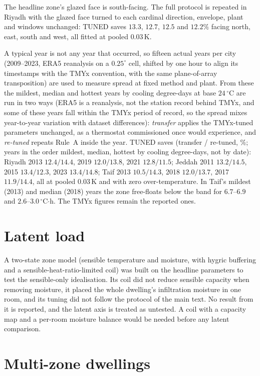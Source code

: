 \documentclass[11pt]{article}
\begin{document}
The headline zone's glazed face is south-facing. The full protocol is repeated in Riyadh with the glazed face turned to each cardinal direction, envelope, plant and windows unchanged: TUNED saves $13.3$, $12.7$, $12.5$ and $12.2\%$ facing north, east, south and west, all fitted at pooled $0.03\,$K.

A typical year is not any year that occurred, so fifteen actual years per city (2009--2023, ERA5 reanalysis on a $0.25^\circ$ cell, shifted by one hour to align its timestamps with the TMYx convention, with the same plane-of-array transposition) are used to measure spread at fixed method and plant. From these the mildest, median and hottest years by cooling degree-days at base $24\,^\circ$C are run in two ways (ERA5 is a reanalysis, not the station record behind TMYx, and some of these years fall within the TMYx period of record, so the spread mixes year-to-year variation with dataset differences): \emph{transfer} applies the TMYx-tuned parameters unchanged, as a thermostat commissioned once would experience, and \emph{re-tuned} repeats Rule~A inside the year. TUNED saves (transfer / re-tuned, \%; years in the order mildest, median, hottest by cooling degree-days, not by date): Riyadh 2013 $12.4/14.4$, 2019 $12.0/13.8$, 2021 $12.8/11.5$; Jeddah 2011 $13.2/14.5$, 2015 $13.4/12.3$, 2023 $13.4/14.8$; Taif 2013 $10.5/14.3$, 2018 $12.0/13.7$, 2017 $11.9/14.4$, all at pooled $0.03\,$K and with zero over-temperature. In Taif's mildest (2013) and median (2018) years the zone free-floats below the band for $6.7$--$6.9$ and $2.6$--$3.0\,^\circ$C$\cdot$h. The TMYx figures remain the reported ones.

\section{Latent load}
\label{sec:s-latent}

A two-state zone model (sensible temperature and moisture, with hygric buffering and a sensible-heat-ratio-limited coil) was built on the headline parameters to test the sensible-only idealisation. Its coil did not reduce sensible capacity when removing moisture, it placed the whole dwelling's infiltration moisture in one room, and its tuning did not follow the protocol of the main text. No result from it is reported, and the latent axis is treated as untested. A coil with a capacity map and a per-room moisture balance would be needed before any latent comparison.

\section{Multi-zone dwellings}
\label{sec:s-mz}
\end{document}
